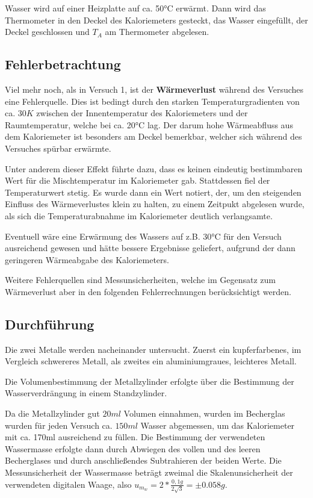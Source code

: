 \documentclass[
  9pt,
]{article}
\begin{document}
Wasser wird auf einer Heizplatte auf ca. 50°C erwärmt. Dann wird das
Thermometer in den Deckel des Kaloriemeters gesteckt, das Wasser
eingefüllt, der Deckel geschlossen und \(T_A\) am Thermometer abgelesen.

\hypertarget{fehlerbetrachtung-1}{%
\subsection{Fehlerbetrachtung}\label{fehlerbetrachtung-1}}

Viel mehr noch, als in Versuch 1, ist der \textbf{Wärmeverlust} während
des Versuches eine Fehlerquelle. Dies ist bedingt durch den starken
Temperaturgradienten von ca. \(30K\) zwischen der Innentemperatur des
Kaloriemeters und der Raumtemperatur, welche bei ca. 20°C lag. Der darum
hohe Wärmeabfluss aus dem Kaloriemeter ist besonders am Deckel
bemerkbar, welcher sich während des Versuches spürbar erwärmte.

Unter anderem dieser Effekt führte dazu, dass es keinen eindeutig
bestimmbaren Wert für die Mischtemperatur im Kaloriemeter gab.
Stattdessen fiel der Temperaturwert stetig. Es wurde dann ein Wert
notiert, der, um den steigenden Einfluss des Wärmeverlustes klein zu
halten, zu einem Zeitpukt abgelesen wurde, als sich die
Temperaturabnahme im Kaloriemeter deutlich verlangsamte.

Eventuell wäre eine Erwärmung des Wassers auf z.B. 30°C für den Versuch
ausreichend gewesen und hätte bessere Ergebnisse geliefert, aufgrund der
dann geringeren Wärmeabgabe des Kaloriemeters.

Weitere Fehlerquellen sind Messunsicherheiten, welche im Gegensatz zum
Wärmeverlust aber in den folgenden Fehlerrechnungen berücksichtigt
werden.

\hypertarget{durchfuxfchrung}{%
\subsection{Durchführung}\label{durchfuxfchrung}}

Die zwei Metalle werden nacheinander untersucht. Zuerst ein
kupferfarbenes, im Vergleich schwereres Metall, als zweites ein
aluminiumgraues, leichteres Metall.

Die Volumenbestimmung der Metallzylinder erfolgte über die Bestimmung
der Wasserverdrängung in einem Standzylinder.

Da die Metallzylinder gut \(20ml\) Volumen einnahmen, wurden im
Becherglas wurden für jeden Versuch ca. \(150ml\) Wasser abgemessen, um
das Kaloriemeter mit ca. 170ml ausreichend zu füllen. Die Bestimmung der
verwendeten Wassermasse erfolgte dann durch Abwiegen des vollen und des
leeren Becherglases und durch anschließendes Subtrahieren der beiden
Werte. Die Messunsicherheit der Wassermasse beträgt zweimal die
Skalenunsicherheit der verwendeten digitalen Waage, also
\(u_{m_w}=2*\frac{0,1g}{2\sqrt{3}}=\pm0.058g\).
\end{document}
